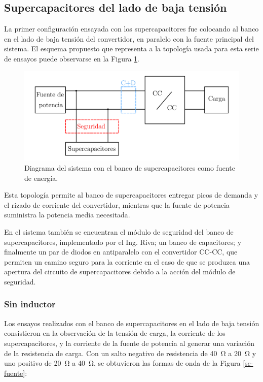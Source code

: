 \subsection{Supercapacitores del lado de baja tensión}
\label{sc-como-alimentacion}

La primer configuración ensayada con los supercapacitores fue colocando al banco en el lado de baja tensión del convertidor, en paralelo con la fuente principal del sistema. El esquema propuesto que representa a la topología usada para esta serie de ensayos puede observarse en la Figura \ref{esquema-sc-fuente}.

\begin{figure}[hbt!]
  \centering
  \includegraphics[width=0.80\columnwidth]{Imágenes/Ensayos/Con módulos de almacenamiento/Supercapacitores/Como fuente/Diagrama del ensayo.pdf}
  \caption{Diagrama del sistema con el banco de supercapacitores como fuente de energía.}
  \label{esquema-sc-fuente}
\end{figure}

Esta topología permite al banco de supercapacitores entregar picos de demanda y el rizado de corriente del convertidor, mientras que la fuente de potencia suministra la potencia media necesitada.

En el sistema también se encuentran el módulo de seguridad del banco de supercapacitores, implementado por el Ing. Riva; un banco de capacitores; y finalmente un par de diodos en antiparalelo con el convertidor CC-CC, que permiten un camino seguro para la corriente en el caso de que se produzca una apertura del circuito de supercapacitores debido a la acción del módulo de seguridad.

\subsubsection{Sin inductor}

Los ensayos realizados con el banco de supercapacitores en el lado de baja tensión consistieron en la observación de la tensión de carga, la corriente de los supercapacitores, y la corriente de la fuente de potencia al generar una variación de la resistencia de carga. Con un salto negativo de resistencia de \SI{40}{\ohm} a \SI{20}{\ohm} y uno positivo de \SI{20}{\ohm} a \SI{40}{\ohm}, se obtuvieron las formas de onda de la Figura \ref{sc-fuente}:

